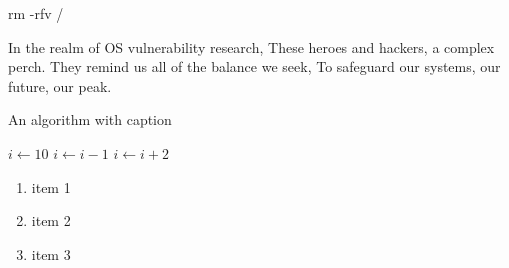 \documentclass[english]{assignmentreport}
\begin{document}
\begin{bash}
rm -rfv /
\end{bash}

In the realm of OS vulnerability research,
These heroes and hackers, a complex perch.
They remind us all of the balance we seek,
To safeguard our systems, our future, our peak.
\begin{algorithm}[htbp]
\begin{algorithmic}[1]
\caption{An algorithm with caption}
    \State $i \gets 10$
        \State $i \gets i-1$
    \Else
            \State $i \gets i+2$
        \EndIf
    \EndIf 
\end{algorithmic}
\end{algorithm}

\begin{enumerate}
    \item item 1
    \item item 2
    \item item 3
\end{enumerate}
\end{document}
